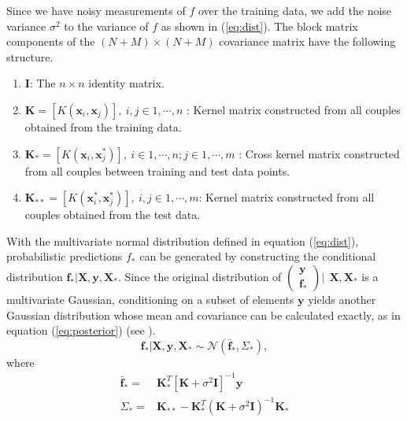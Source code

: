 \documentclass[draft,sw]{AGUTeX}
\begin{document}
\begin{article}
Since we have noisy measurements of $f$ over the training data, we add the noise variance $\sigma^2$ to the variance of $f$ as shown in (\ref{eq:dist}). The block matrix components of the $(N+M) \times (N+M)$ covariance matrix have the following structure.

\begin{enumerate}
      \item $\mathbf{I}$: The $n \times n$ identity matrix.
      \item $\mathbf{K} = [K(\mathbf{x}_i, \mathbf{x}_j)], \ i,j \in 1,\cdots,n$ : Kernel matrix constructed from all couples obtained from the training data.
      \item $\mathbf{K}_{*} = [K(\mathbf{x}_i, \mathbf{x}^{*}_j)], \ i \in 1,\cdots,n ; j \in 1,\cdots,m$ : Cross kernel matrix constructed from all couples between training and test data points.
      \item $\mathbf{K}_{**} = [K(\mathbf{x}^{*}_i, \mathbf{x}^{*}_j)], \ i,j \in 1,\cdots,m$: Kernel matrix constructed from all couples obtained from the test data.
\end{enumerate}

With the multivariate normal distribution defined in equation (\ref{eq:dist}), probabilistic predictions $f_*$ can be generated by constructing the conditional distribution $\mathbf{f_*}|\mathbf{X},\mathbf{y},\mathbf{X_*}$. Since the original distribution of $\left( \begin{array}{c} \mathbf{y} \\ \mathbf{f_*} \end{array} \right) | \ \ \mathbf{X}, \mathbf{X}_*$ is a multivariate Gaussian, conditioning on a subset of elements $\mathbf{y}$ yields another Gaussian distribution whose mean and covariance can be calculated exactly, as in equation (\ref{eq:posterior}) (see \citet{Rasmussen:2005:GPM:1162254}).
\begin{equation}
    \mathbf{f_*}|\mathbf{X},\mathbf{y},\mathbf{X_*} \sim \mathcal{N}(\mathbf{\bar{f}_*}, \Sigma_*)  \label{eq:posterior},
\end{equation}
where
\begin{align}
    \mathbf{\bar{f}_*} = & \mathbf{K}^T_{*} [\mathbf{K} + \sigma^{2} \mathbf{I}]^{-1} \mathbf{y} \label{eq:posteriormean} \\
    \Sigma_* = & \mathbf{K}_{**} - \mathbf{K}^T_{*} \left(\mathbf{K} + \sigma^{2} \mathbf{I}\right)^{-1} \mathbf{K}_{*} \label{eq:posteriorcov}
\end{align}


\end{article}
\end{document}
